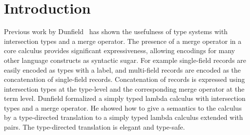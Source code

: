 \section{Introduction}
\label{sec:intro}

Previous work by Dunfield~\cite{dunfield2014elaborating} has shown the
usefulness of type systems with intersection types and a merge operator. The presence of a merge
operator in a core calculus provides significant expressiveness, allowing
encodings for many other language constructs as syntactic sugar. For example
single-field records are easily encoded as types with a label, and multi-field
records are encoded as the concatenation of single-field records. Concatenation
of records is expressed using intersection types at the type-level and the
corresponding merge operator at the term level. Dunfield formalized a simply
typed lambda calculus with intersection types and a merge operator. He showed
how to give a semantics to the calculus by a type-directed translation to a
simply typed lambda calculus extended with pairs. The type-directed translation
is elegant and type-safe.


